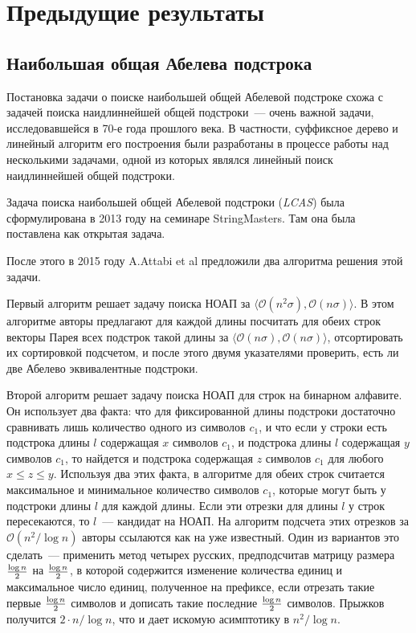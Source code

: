\section{Предыдущие результаты}
\subsection{Наибольшая общая Абелева подстрока}
Постановка задачи о поиске наибольшей общей Абелевой подстроке схожа с задачей поиска наидлиннейшей общей подстроки~--- очень важной задачи, исследовавшейся в 70-е года прошлого века. В частности, суффиксное дерево и линейный алгоритм его построения были разработаны в процессе работы над несколькими задачами, одной из которых являлся линейный поиск наидлиннейшей общей подстроки.

Задача поиска наибольшей общей Абелевой подстроки (\textit{LCAS}) была сформулирована в 2013 году на семинаре StringMasters. Там она была поставлена как открытая задача. 

После этого в 2015 году A.Attabi et al \cite{1} предложили два алгоритма решения этой задачи. 

Первый алгоритм решает задачу поиска НОАП за $\langle \mathcal{O}(n^2 \sigma), \mathcal{O}(n \sigma) \rangle$. В этом алгоритме авторы предлагают для каждой длины посчитать для обеих строк векторы Парея всех подстрок такой длины за $\langle \mathcal{O}(n \sigma), \mathcal{O}(n \sigma) \rangle$, отсортировать их сортировкой подсчетом, и после этого двумя указателями проверить, есть ли две Абелево эквивалентные подстроки.

Второй алгоритм решает задачу поиска НОАП для строк на бинарном алфавите. Он использует два факта: что для фиксированной длины подстроки достаточно сравнивать лишь количество одного из символов $c_1$, и что если у строки есть подстрока длины $l$ содержащая $x$ символов $c_1$, и подстрока длины $l$ содержащая $y$ символов $c_1$, то найдется и подстрока содержащая $z$ символов $c_1$ для любого $x \le z \le y$. Используя два этих факта, в алгоритме для обеих строк считается максимальное и минимальное количество символов $c_1$, которые могут быть у подстроки длины $l$ для каждой длины. Если эти отрезки для длины $l$ у строк пересекаются, то $l$~--- кандидат на НОАП. На алгоритм подсчета этих отрезков за $\mathcal{O}(n^2 / \log n)$ авторы ссылаются как на уже известный. Один из вариантов это сделать~--- применить метод четырех русских, предподсчитав матрицу размера $\log n \over 2$ на $\log n \over 2$, в которой содержится изменение количества единиц и максимальное число единиц, полученное на префиксе, если отрезать такие первые $\log n \over 2$ символов и дописать такие последние $\log n \over 2$ символов. Прыжков получится $2 \cdot n / \log n$, что и дает искомую асимптотику в $n^2 / \log n$.

